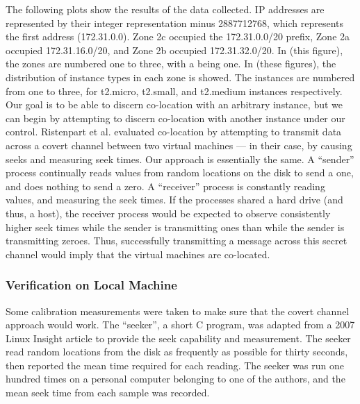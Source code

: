 \documentclass[conference]{IEEEtran}
\begin{document}
The following plots show the results of the data collected. 
IP addresses are represented by their integer representation minus 2887712768, which represents the first address 
(172.31.0.0). 
Zone 2c occupied the 172.31.0.0/20 prefix, Zone 2a occupied 172.31.16.0/20, and Zone 2b occupied 172.31.32.0/20. 
In (this figure), the zones are numbered one to three, with a being one.
In (these figures), the distribution of instance types in each zone is showed. The instances are numbered from 
one to three, for t2.micro, t2.small, and t2.medium instances respectively.
Our goal is to be able to discern co-location with an arbitrary instance, but we can begin by attempting to discern
  co-location with another instance under our control.
Ristenpart et al. evaluated co-location by attempting to transmit data across a covert channel between two virtual
  machines --- in their case, by causing seeks and measuring seek times. Our approach is essentially the same.
A ``sender'' process continually reads values from random locations on the disk to send a one, and does nothing to
  send a zero.
A ``receiver'' process is constantly reading values, and measuring the seek times.
If the processes shared a hard drive (and thus, a host), the receiver process would be expected to observe consistently
  higher seek times while the sender is transmitting ones than while the sender is transmitting zeroes.
Thus, successfully transmitting a message across this secret channel would imply that the virtual machines are
  co-located.

\subsubsection{Verification on Local Machine}
Some calibration measurements were taken to make sure that the covert channel approach would work.
The ``seeker'', a short C program, was adapted from a 2007 Linux Insight article \cite{seeker07} to provide the seek
  capability and measurement.
The seeker read random locations from the disk as frequently as possible for thirty seconds, then reported the mean
  time required for each reading.
The seeker was run one hundred times on a personal computer belonging to one of the authors, and the mean seek time
  from each sample was recorded.
\end{document}
